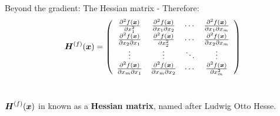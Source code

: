\begin{frame}[t,allowframebreaks]{
    Beyond the gradient: The Hessian matrix -}
    Therefore:\\
    \vspace{-0.6cm}
    \begin{equation}
        \boldsymbol{H}^{(f)}(\boldsymbol{x}) = 
        \left(
            \begin{array}{cccc}
                \frac{\partial^2 f(\boldsymbol{x})}{\partial x_1^2} & 
                \frac{\partial^2 f(\boldsymbol{x})}{\partial x_1 \partial x_2} &
                \cdots & 
                \frac{\partial^2 f(\boldsymbol{x})}{\partial x_1 \partial x_m} \\ 
                \frac{\partial^2 f(\boldsymbol{x})}{\partial x_2 \partial x_1} & 
                \frac{\partial^2 f(\boldsymbol{x})}{\partial x_2^2} &
                \cdots & 
                \frac{\partial^2 f(\boldsymbol{x})}{\partial x_2 \partial x_m} \\ 
                \vdots &
                \vdots &
                \ddots & 
                \vdots \\
                \frac{\partial^2 f(\boldsymbol{x})}{\partial x_m \partial x_1} & 
                \frac{\partial^2 f(\boldsymbol{x})}{\partial x_m \partial x_2} & 
                \cdots & 
                \frac{\partial^2 f(\boldsymbol{x})}{\partial x_m^2} \\ 
            \end{array}
        \right)
        \label{eq:hessian_2}
    \end{equation}\\
    
    \vspace{0.250cm}

    $\boldsymbol{H}^{(f)}(\boldsymbol{x})$ in known as a {\bf \gls{Hessian matrix}}, 
    named after Ludwig Otto Hesse.\\


\end{frame}
